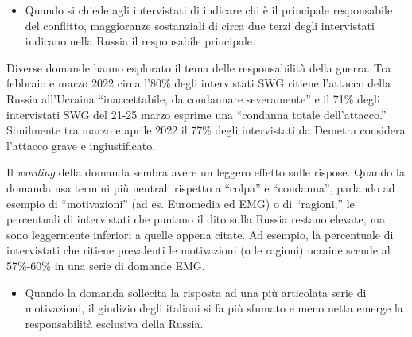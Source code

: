 \documentclass[
]{book}
\providecommand{\tightlist}{%
  \setlength{\itemsep}{0pt}\setlength{\parskip}{0pt}}
\begin{document}
\begin{itemize}
\tightlist
\item
  Quando si chiede agli intervistati di indicare chi è il principale responsabile del conflitto, maggioranze sostanziali di circa due terzi degli intervistati indicano nella Russia il responsabile principale.
\end{itemize}

Diverse domande hanno esplorato il tema delle responsabilità della guerra. Tra febbraio e marzo 2022 circa l'80\% degli intervistati SWG ritiene l'attacco della Russia all'Ucraina ``inaccettabile, da condannare severamente'' e il 71\% degli intervistati SWG del 21-25 marzo esprime una ``condanna totale dell'attacco.'' Similmente tra marzo e aprile 2022 il 77\% degli intervistati da Demetra considera l'attacco grave e ingiustificato.

Il \emph{wording} della domanda sembra avere un leggero effetto sulle rispose. Quando la domanda usa termini più neutrali rispetto a ``colpa'' e ``condanna'', parlando ad esempio di ``motivazioni'' (ad es. Euromedia ed EMG) o di ``ragioni,'' le percentuali di intervistati che puntano il dito sulla Russia restano elevate, ma sono leggermente inferiori a quelle appena citate. Ad esempio, la percentuale di intervistati che ritiene prevalenti le motivazioni (o le ragioni) ucraine scende al 57\%-60\% in una serie di domande EMG.

\begin{itemize}
\tightlist
\item
  Quando la domanda sollecita la risposta ad una più articolata serie di motivazioni, il giudizio degli italiani si fa più sfumato e meno netta emerge la responsabilità esclusiva della Russia.
\end{itemize}
\end{document}
